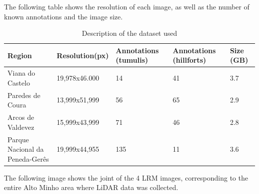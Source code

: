 The following table shows the resolution of each image, as well as the number of known annotations and the image size.

\begin{table}[h!]
\centering
\begin{tabular}{|p{3cm}|p{2.5cm}|p{2cm}|p{2cm}|p{2cm}|} 
 \hline
  Region & Resolution(px) & Annotations (tumulis) & Annotations (hillforts) & Size (GB) \\ [0.5ex] 
 \hline\hline
 Viana do Castelo & 19,978x46.000 & 14 & 41 & 3.7\\ 
 Paredes de Coura & 13,999x51,999 & 56 & 65 & 2.9 \\
 Arcos de Valdevez & 15,999x43,999 & 71 & 46 & 2.8\\
 Parque Nacional da Peneda-Gerês & 19,999x44,955 & 135 & 11 & 3.6\\ [1ex] 
 \hline
\end{tabular}
\caption{Description of the dataset used}
\end{table}

The following image shows the joint of the 4 LRM images, corresponding to the entire Alto Minho area where LiDAR data was collected.

